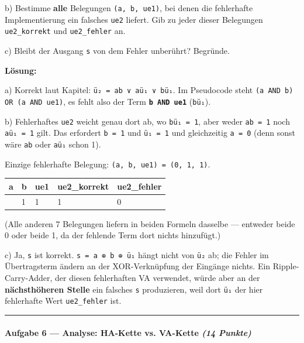 \documentclass[11pt, a4paper]{article}
\begin{document}
b) Bestimme \textbf{alle} Belegungen \texttt{(a, b, ue1)}, bei denen die fehlerhafte Implementierung ein falsches \texttt{ue2} liefert. Gib zu jeder dieser Belegungen \texttt{ue2\_korrekt} und \texttt{ue2\_fehler} an.


c) Bleibt der Ausgang \texttt{s} von dem Fehler unberührt? Begründe.


\textbf{Lösung:}


a) Korrekt laut Kapitel: \texttt{ü₂ = ab ∨ aü₁ ∨ bü₁}. Im Pseudocode steht \texttt{(a AND b) OR (a AND ue1)}, es fehlt also der Term \textbf{\texttt{b AND ue1}} (\texttt{bü₁}).


b) Fehlerhaftes \texttt{ue2} weicht genau dort ab, wo \texttt{bü₁ = 1}, aber weder \texttt{ab = 1} noch \texttt{aü₁ = 1} gilt. Das erfordert \texttt{b = 1} und \texttt{ü₁ = 1} und gleichzeitig \texttt{a = 0} (denn sonst wäre \texttt{ab} oder \texttt{aü₁} schon 1).


Einzige fehlerhafte Belegung: \texttt{(a, b, ue1) = (0, 1, 1)}.



{\small
\begin{tabularx}{\linewidth}{XXXXX}
\hline
\rowcolor{tableheadbg}
{\color{white}\textbf{a}} & {\color{white}\textbf{b}} & {\color{white}\textbf{ue1}} & {\color{white}\textbf{ue2\_korrekt}} & {\color{white}\textbf{ue2\_fehler}} \\[2pt]
\hline
\endhead
\hline
\endfoot
0 & 1 & 1 & 1 & 0 \\
\end{tabularx}
}


(Alle anderen 7 Belegungen liefern in beiden Formeln dasselbe — entweder beide 0 oder beide 1, da der fehlende Term dort nichts hinzufügt.)


c) Ja, \texttt{s} ist korrekt. \texttt{s = a ⊕ b ⊕ ü₁} hängt nicht von \texttt{ü₂} ab; die Fehler im Übertragsterm ändern an der XOR-Verknüpfung der Eingänge nichts. Ein Ripple-Carry-Adder, der diesen fehlerhaften VA verwendet, würde aber an der \textbf{nächsthöheren Stelle} ein falsches \texttt{s} produzieren, weil dort \texttt{ü₁} der hier fehlerhafte Wert \texttt{ue2\_fehler} ist.



\noindent\textcolor{rulegray}{\rule{\linewidth}{0.4pt}}


\paragraph{Aufgabe 6 — Analyse: HA-Kette vs. VA-Kette \textit{(14 Punkte)}}\mbox{}\\[2pt]
\end{document}
